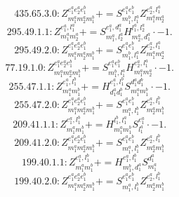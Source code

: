\documentclass[letterpaper,10pt,fleqn,leqno,onecolumn]{article}
\begin{document}
\begin{equation} \;\;\;\;\;\;  435.65.3.0: Z^{e_{1}^{a}e_{2}^{a}e_{1}^{b}}_{m_{1}^{a}m_{2}^{a}m_{1}^{b}}+=S^{e_{1}^{a}e_{1}^{b}}_{m_{1}^{b},l_{1}^{a}}Z^{e_{2}^{a},l_{1}^{a}}_{m_{1}^{a}m_{2}^{a}} \end{equation}
\begin{equation} \;\;\;\;\;\;  295.49.1.1: Z^{e_{1}^{a},l_{1}^{a}}_{m_{1}^{a}m_{2}^{a}}+=S^{e_{1}^{a},d_{1}^{a}}_{m_{1}^{a},l_{2}^{a}}H^{l_{1}^{a},l_{2}^{a}}_{m_{2}^{a},d_{1}^{a}}\cdot -1. \end{equation}
\begin{equation} \;\;\;\;\;\;  295.49.2.0: Z^{e_{1}^{a}e_{2}^{a}e_{1}^{b}}_{m_{1}^{a}m_{2}^{a}m_{1}^{b}}+=S^{e_{1}^{a}e_{1}^{b}}_{m_{1}^{b},l_{1}^{a}}Z^{e_{2}^{a},l_{1}^{a}}_{m_{1}^{a}m_{2}^{a}} \end{equation}
\begin{equation} \;\;\;\;\;\;  77.19.1.0: Z^{e_{1}^{a}e_{2}^{a}e_{1}^{b}}_{m_{1}^{a}m_{2}^{a}m_{1}^{b}}+=S^{e_{1}^{a}e_{1}^{b}}_{m_{1}^{b},l_{1}^{a}}H^{e_{2}^{a},l_{1}^{a}}_{m_{1}^{a}m_{2}^{a}}\cdot -1. \end{equation}
\begin{equation} \;\;\;\;\;\;  255.47.1.1: Z^{e_{1}^{a},l_{1}^{b}}_{m_{1}^{a}m_{1}^{b}}+=H^{e_{1}^{a},l_{1}^{b}}_{d_{1}^{a}d_{1}^{b}}S^{d_{1}^{a}d_{1}^{b}}_{m_{1}^{a}m_{1}^{b}}\cdot -1. \end{equation}
\begin{equation} \;\;\;\;\;\;  255.47.2.0: Z^{e_{1}^{a}e_{2}^{a}e_{1}^{b}}_{m_{1}^{a}m_{2}^{a}m_{1}^{b}}+=S^{e_{1}^{a}e_{1}^{b}}_{m_{1}^{a},l_{1}^{b}}Z^{e_{2}^{a},l_{1}^{b}}_{m_{2}^{a}m_{1}^{b}} \end{equation}
\begin{equation} \;\;\;\;\;\;  209.41.1.1: Z^{e_{1}^{a},l_{1}^{b}}_{m_{1}^{a}m_{1}^{b}}+=H^{l_{1}^{b},l_{1}^{a}}_{m_{1}^{a}m_{1}^{b}}S^{e_{1}^{a}}_{l_{1}^{a}}\cdot -1. \end{equation}
\begin{equation} \;\;\;\;\;\;  209.41.2.0: Z^{e_{1}^{a}e_{2}^{a}e_{1}^{b}}_{m_{1}^{a}m_{2}^{a}m_{1}^{b}}+=S^{e_{1}^{a}e_{1}^{b}}_{m_{1}^{a},l_{1}^{b}}Z^{e_{2}^{a},l_{1}^{b}}_{m_{2}^{a}m_{1}^{b}} \end{equation}
\begin{equation} \;\;\;\;\;\;  199.40.1.1: Z^{e_{1}^{a},l_{1}^{b}}_{m_{1}^{a}m_{1}^{b}}+=H^{e_{1}^{a},l_{1}^{b}}_{m_{1}^{b},d_{1}^{a}}S^{d_{1}^{a}}_{m_{1}^{a}} \end{equation}
\begin{equation} \;\;\;\;\;\;  199.40.2.0: Z^{e_{1}^{a}e_{2}^{a}e_{1}^{b}}_{m_{1}^{a}m_{2}^{a}m_{1}^{b}}+=S^{e_{1}^{a}e_{1}^{b}}_{m_{1}^{a},l_{1}^{b}}Z^{e_{2}^{a},l_{1}^{b}}_{m_{2}^{a}m_{1}^{b}} \end{equation}
\end{document}
